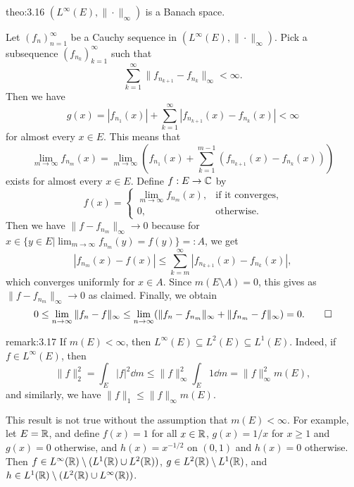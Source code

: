 \begin{theo}{theo:3.16}
    $(L^\infty(E), \|\cdot\|_\infty)$ is a Banach space. 
\end{theo}
\begin{pf}
    Let $(f_n)_{n=1}^\infty$ be a Cauchy sequence in $(L^\infty(E), 
    \|\cdot\|_\infty)$. Pick a subsequence $(f_{n_k})_{k=1}^\infty$ such that 
    \[ \sum_{k=1}^\infty \|f_{n_{k+1}} - f_{n_k}\|_\infty < \infty. \] 
    Then we have 
    \[ g(x) = |f_{n_1}(x)| + \sum_{k=1}^\infty |f_{n_{k+1}}(x) - f_{n_k}(x)|
    < \infty \] 
    for almost every $x \in E$. This means that 
    \[ \lim_{m\to\infty} f_{n_m}(x) = \lim_{m\to\infty} 
    \left( f_{n_1}(x) + \sum_{k=1}^{m-1} (f_{n_{k+1}}(x) - f_{n_k}(x)) \right) \] 
    exists for almost every $x \in E$. Define $f : E \to \mathbb{C}$ by 
    \[ f(x) = \begin{cases}
        \lim_{m\to\infty} f_{n_m}(x), & \text{if it converges,} \\ 
        0, & \text{otherwise.} 
    \end{cases} \] 
    Then we have $\|f - f_{n_m}\|_\infty \to 0$ because for 
    $x \in \{y \in E | \lim_{m\to\infty} f_{n_m}(y) = f(y)\} =: A$, 
    we get 
    \[ |f_{n_m}(x) - f(x)| \leq \sum_{k=m}^\infty |f_{n_{k+1}}(x) - f_{n_k}(x)|, \] 
    which converges uniformly for $x \in A$. Since $m(E \setminus A) = 0$, 
    this gives as $\|f - f_{n_m}\|_\infty \to 0$ as claimed. Finally, we obtain 
    \[ 0 \leq \lim_{n\to\infty} \|f_n - f\|_\infty \leq 
    \lim_{n\to\infty} (\|f_n - f_{n_m}\|_\infty + \|f_{n_m} - f\|_\infty) 
    = 0. \qedhere \] 
\end{pf}

\begin{remark}{remark:3.17}
    If $m(E) < \infty$, then $L^\infty(E) \subseteq L^2(E) \subseteq L^1(E)$. 
    Indeed, if $f \in L^\infty(E)$, then 
    \[ \|f\|_2^2 = \int_E |f|^2\dd m \leq \|f\|_\infty^2 \int_E 1\dd m 
    = \|f\|_\infty^2 m(E), \] 
    and similarly, we have $\|f\|_1 \leq \|f\|_\infty m(E)$. 

    This result is not true without the assumption that $m(E) < \infty$. 
    For example, let $E = \mathbb{R}$, and define $f(x) = 1$ for all $x \in \mathbb{R}$, 
    $g(x) = 1/x$ for $x \geq 1$ and $g(x) = 0$ otherwise, and 
    $h(x) = x^{-1/2}$ on $(0, 1)$ and $h(x) = 0$ otherwise. Then 
    $f \in L^\infty(\mathbb{R}) \setminus (L^1(\mathbb{R}) \cup L^2(\mathbb{R}))$, 
    $g \in L^2(\mathbb{R}) \setminus L^1(\mathbb{R})$, and $h \in L^1(\mathbb{R}) \setminus 
    (L^2(\mathbb{R}) \cup L^\infty(\mathbb{R}))$. 
\end{remark}

